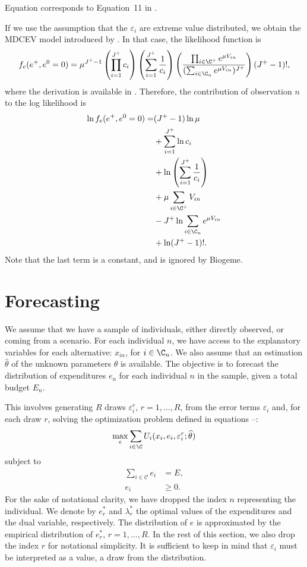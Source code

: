 \documentclass[12pt,a4paper]{article}
\begin{document}
Equation  corresponds to Equation~11 in .

If we use the assumption that the $\varepsilon_{i}$ are extreme value distributed, we obtain the MDCEV model introduced by . In that case,  the likelihood function  is
\begin{equation}
  f_e(e^+, e^0=0) = \mu^{J^+-1}\left(\prod_{i=1}^{J^+} c_i\right)\left(\sum_{i=1}^{J^+}\frac{1}{c_i}\right) \left( \frac{\prod_{i \in \C^+} e^{\mu V_{in}}}{(\sum_{i\in\C_n} e^{\mu V_{in}})^{J^+}} \right) (J^+-1)!,
\end{equation}
where the derivation is available in . Therefore, the contribution of observation $n$ to the log likelihood is
\begin{align*}
  \ln  f_e(e^+, e^0=0) =& (J^+-1) \ln \mu \\
  &+ \sum_{i=1}^{J^+} \ln c_i \\
  &+ \ln\left(\sum_{i=1}^{J^+}\frac{1}{c_i}\right)\\
  &+ \mu \sum_{i \in \C^+} V_{in} \\
  &- J^+ \ln \sum_{i\in\C_n} e^{\mu V_{in}} \\
  &+ \ln (J^+-1)!.
\end{align*}
Note that the last term is a constant, and is ignored by Biogeme.

\section{Forecasting}
\label{sec:forecasting}
We assume that we have  a sample of individuals, either directly observed, or coming from a scenario. For each individual $n$, we have access to the explanatory
variables for each alternative: $x_{in}$, for $i \in \C_n$. We also assume that an estimation $\widehat{\theta}$ of the unknown parameters $\theta$ is available. The objective is to forecast the
distribution of expenditures $e_{n}$ for each individual $n$ in the sample, given a total budget $E_n$.

This involves generating $R$ draws $\varepsilon^r_i$, $r=1, \ldots, R$, from the error terms $\varepsilon_{i}$ and, for each draw $r$, solving the
optimization problem defined in equations --:
\[
\max_{e} \sum_{i \in \C} U_{i}(x_{i}, e_{i}, \varepsilon^r_i; \widehat{\theta})
\]
subject to
\begin{align*}
  \sum_{i \in \mathcal{C}} e_{i} &= E,\\
 e_{i} &\geq 0.
\end{align*}
For the sake of notational clarity, we have dropped the index $n$ representing the individual. We denote by $e_r^*$ and $\lambda_r^*$
the optimal values of the expenditures and the dual variable, respectively. The distribution of $e$ is approximated by the empirical distribution
of $e_r^*$, $r=1, \ldots, R$. In the rest of this section, we also drop the index $r$ for notational simplicity.
It is sufficient to keep in mind that $\varepsilon_i$ must be interpreted as a value, a draw from the distribution.
\end{document}
